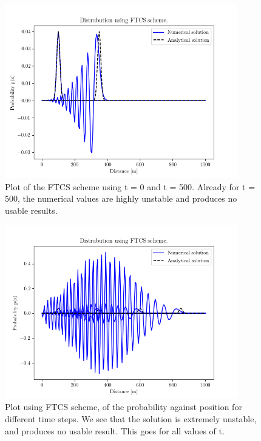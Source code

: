 \documentclass[10pt, a4paper]{amsart}
\begin{document}
\begin{figure}
	\centering
	\includegraphics[width=0.9\textwidth]{../code/2c1.png}
	\caption{Plot of the FTCS scheme using t = 0 and t = 500. Already for t = 500, the numerical values are highly unstable and produces no usable results.}
	\label{fig:2c1}
\end{figure}

\begin{figure}
	\centering
	\includegraphics[width=0.9\textwidth]{../code/2c2.png}
	\caption{Plot using FTCS scheme, of the probability against position for different time steps. We see that the solution is extremely unstable, and produces no usable result. This goes for all values of t.}
		\label{fig:2c2}
\end{figure}
\end{document}

